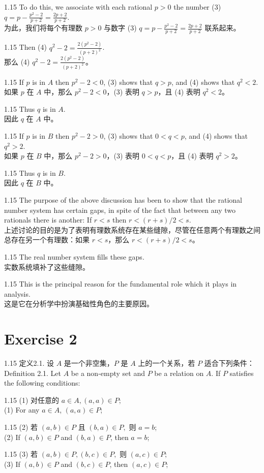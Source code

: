 \documentclass[12pt,a4paper]{article}
\newcommand{\bilingual}[2]{
    \begin{spacing}{1.15} %
        \noindent \normalsize #1 \\[-0.5ex] %
        \small \textcolor{blue!70!black}{#2} %
    \end{spacing}
    \vspace{0.8em} %
}
\begin{document}
\bilingual{To do this, we associate with each rational $p>0$ the number (3) $q=p-\frac{p^{2}-2}{p+2}=\frac{2p+2}{p+2}$.}{为此，我们将每个有理数 $p>0$ 与数字 (3) $q=p-\frac{p^{2}-2}{p+2}=\frac{2p+2}{p+2}$ 联系起来。}

\bilingual{Then (4) $q^{2}-2=\frac{2(p^{2}-2)}{(p+2)^{2}}$.}{那么 (4) $q^{2}-2=\frac{2(p^{2}-2)}{(p+2)^{2}}$。}

\bilingual{If $p$ is in $A$ then $p^{2}-2<0$, (3) shows that $q>p$, and (4) shows that $q^{2}<2$.}{如果 $p$ 在 $A$ 中，那么 $p^{2}-2<0$，(3) 表明 $q>p$，且 (4) 表明 $q^{2}<2$。}

\bilingual{Thus $q$ is in $A$.}{因此 $q$ 在 $A$ 中。}

\bilingual{If $p$ is in $B$ then $p^{2}-2>0$, (3) shows that $0<q<p$, and (4) shows that $q^{2}>2$.}{如果 $p$ 在 $B$ 中，那么 $p^{2}-2>0$，(3) 表明 $0<q<p$，且 (4) 表明 $q^{2}>2$。}

\bilingual{Thus $q$ is in $B$.}{因此 $q$ 在 $B$ 中。}

\bilingual{The purpose of the above discussion has been to show that the rational number system has certain gaps, in spite of the fact that between any two rationals there is another: If $r<s$ then $r<(r+s)/2<s$.}{上述讨论的目的是为了表明有理数系统存在某些缝隙，尽管在任意两个有理数之间总存在另一个有理数：如果 $r<s$，那么 $r<(r+s)/2<s$。}

\bilingual{The real number system fills these gaps.}{实数系统填补了这些缝隙。}

\bilingual{This is the principal reason for the fundamental role which it plays in analysis.}{这是它在分析学中扮演基础性角色的主要原因。}


\vspace{1em}
\section*{Exercise 2}

\bilingual{定义2.1. 设 $A$ 是一个非空集，$P$ 是 $A$ 上的一个关系，若 $P$ 适合下列条件：}{Definition 2.1. Let $A$ be a non-empty set and $P$ be a relation on $A$. If $P$ satisfies the following conditions:}

\bilingual{(1) 对任意的 $a\in A,(a,a)\in P;$}{(1) For any $a \in A$, $(a, a) \in P$;}

\bilingual{(2) 若 $(a,b)\in P$ 且 $(b,a)\in P,$ 则 $a=b$;}{(2) If $(a, b) \in P$ and $(b, a) \in P$, then $a = b$;}

\bilingual{(3) 若 $(a,b)\in P,(b,c)\in P,$ 则 $(a,c)\in P;$}{(3) If $(a, b) \in P$ and $(b, c) \in P$, then $(a, c) \in P$;}
\end{document}

